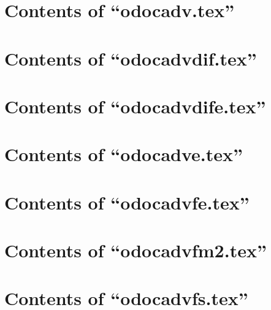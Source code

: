 \section{Contents of ``odocadv.tex''}

\begin{itemize}

\end{itemize}

\section{Contents of ``odocadvdif.tex''}

\begin{itemize}

\end{itemize}

\section{Contents of ``odocadvdife.tex''}

\begin{itemize}

\end{itemize}

\section{Contents of ``odocadve.tex''}

\begin{itemize}

\end{itemize}

\section{Contents of ``odocadvfe.tex''}

\begin{itemize}

\end{itemize}

\section{Contents of ``odocadvfm2.tex''}

\begin{itemize}

\end{itemize}

\section{Contents of ``odocadvfs.tex''}

